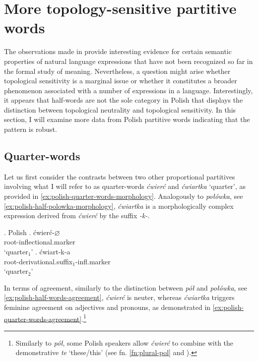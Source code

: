 \section{More topology-sensitive partitive words}\label{sec:more-topology-sensitive-partitive-words}

The observations made in  provide interesting evidence for certain semantic properties of natural language expressions that have not been recognized so far in the formal study of meaning. Nevertheless, a question might arise whether topological sensitivity is a marginal issue or whether it constitutes a broader phenomenon associated with a number of expressions in a language. Interestingly, it appears that half-words are not the sole category in Polish that displays the distinction between topological neutrality and topological sensitivity. In this section, I will examine more data from Polish partitive words indicating that the pattern is robust. 

\subsection{Quarter-words}\label{sec:quarter-words}

Let us first consider the contrasts between two other proportional partitives involving what I will refer to as quarter-words \textit{ćwierć} and \textit{ćwiartka} `quarter', as provided in \ref{ex:polish-quarter-words-morphology}. Analogously to \textit{połówka}, see \ref{ex:polish-half-polowka-morphology}, \textit{ćwiartka} is a morphologically complex expression derived from \textit{ćwierć} by the suffix \textit{-k-}.

		\ex. Polish\label{ex:polish-quarter-words-morphology}
        \ag. ćwierć-$\varnothing$\\
		root-inflectional.marker\\
		`quarter$_1$'\label{ex:polish-half-cwierc-morphology}
		\bg. ćwiart-k-a\\
		root-derivational.suffix$_1$-infl.marker\\
		`quarter$_2$'\label{ex:polish-half-cwiartka-morphology}

In terms of agreement, similarly to the distinction between \textit{pół} and \textit{połówka}, see \ref{ex:polish-half-words-agreement}, \textit{ćwierć} is neuter, whereas \textit{ćwiartka} triggers feminine agreement on adjectives and pronouns, as demonstrated in \ref{ex:polish-quarter-words-agreement}.\footnote{Similarly to \textit{pół}, some Polish speakers allow \textit{ćwierć} to combine with the demonstrative \textit{te} `these/this' (see fn. \ref{fn:plural-pol} and \citealt{przepiorkowski2006inherentnej}).}

